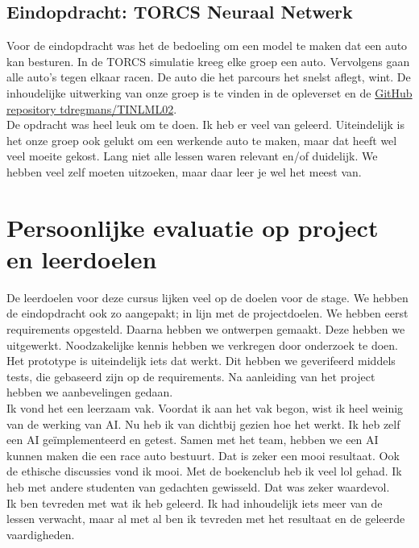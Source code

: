 \documentclass{article} %
\begin{document}
        \newpage

        \subsection{Eindopdracht: TORCS Neuraal Netwerk}
        
            Voor de eindopdracht was het de bedoeling om een model te maken dat een auto kan besturen. In de TORCS simulatie kreeg elke groep een auto. Vervolgens gaan alle auto's tegen elkaar racen. De auto die het parcours het snelst aflegt, wint. De inhoudelijke uitwerking van onze groep is te vinden in de opleverset en de \href{https://github.com/tdregmans/TINLML02}{GitHub repository tdregmans/TINLML02}. \\
            De opdracht was heel leuk om te doen. Ik heb er veel van geleerd. Uiteindelijk is het onze groep ook gelukt om een werkende auto te maken, maar dat heeft wel veel moeite gekost. Lang niet alle lessen waren relevant en/of duidelijk. We hebben veel zelf moeten uitzoeken, maar daar leer je wel het meest van. 
    
        \newpage


    \section{Persoonlijke evaluatie op project en leerdoelen}

    De leerdoelen voor deze cursus lijken veel op de doelen voor de stage. We hebben de eindopdracht ook zo aangepakt; in lijn met de projectdoelen. We hebben eerst requirements opgesteld. Daarna hebben we ontwerpen gemaakt. Deze hebben we uitgewerkt. Noodzakelijke kennis hebben we verkregen door onderzoek te doen. Het prototype is uiteindelijk iets dat werkt. Dit hebben we geverifeerd middels tests, die gebaseerd zijn op de requirements. Na aanleiding van het project hebben we aanbevelingen gedaan. \\
    Ik vond het een leerzaam vak. Voordat ik aan het vak begon, wist ik heel weinig van de werking van AI. Nu heb ik van dichtbij gezien hoe het werkt. Ik heb zelf een AI geïmplementeerd en getest. Samen met het team, hebben we een AI kunnen maken die een race auto bestuurt. Dat is zeker een mooi resultaat. Ook de ethische discussies vond ik mooi. Met de boekenclub heb ik veel lol gehad. Ik heb met andere studenten van gedachten gewisseld. Dat was zeker waardevol. \\
    Ik ben tevreden met wat ik heb geleerd. Ik had inhoudelijk iets meer van de lessen verwacht, maar al met al ben ik tevreden met het resultaat en de geleerde vaardigheden.

    \newpage
\end{document}
